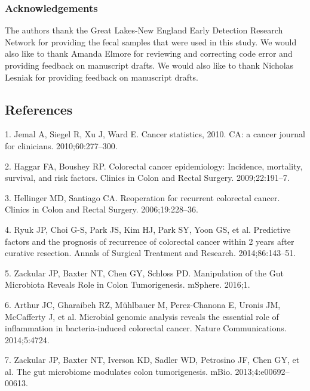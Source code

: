 \documentclass[12pt,]{article}
\begin{document}
\subsubsection{Acknowledgements}\label{acknowledgements}

The authors thank the Great Lakes-New England Early Detection Research
Network for providing the fecal samples that were used in this study. We
would also like to thank Amanda Elmore for reviewing and correcting code
error and providing feedback on manuscript drafts. We would also like to
thank Nicholas Lesniak for providing feedback on manuscript drafts.

\newpage

\subsection*{References}\label{references}

\hypertarget{refs}{}
\hypertarget{ref-jemal_cancer_2010}{}
1. Jemal A, Siegel R, Xu J, Ward E. Cancer statistics, 2010. CA: a
cancer journal for clinicians. 2010;60:277--300.

\hypertarget{ref-haggar_colorectal_2009}{}
2. Haggar FA, Boushey RP. Colorectal cancer epidemiology: Incidence,
mortality, survival, and risk factors. Clinics in Colon and Rectal
Surgery. 2009;22:191--7.

\hypertarget{ref-hellinger_reoperation_2006}{}
3. Hellinger MD, Santiago CA. Reoperation for recurrent colorectal
cancer. Clinics in Colon and Rectal Surgery. 2006;19:228--36.

\hypertarget{ref-ryuk_predictive_2014}{}
4. Ryuk JP, Choi G-S, Park JS, Kim HJ, Park SY, Yoon GS, et al.
Predictive factors and the prognosis of recurrence of colorectal cancer
within 2 years after curative resection. Annals of Surgical Treatment
and Research. 2014;86:143--51.

\hypertarget{ref-zackular_manipulation_2016}{}
5. Zackular JP, Baxter NT, Chen GY, Schloss PD. Manipulation of the Gut
Microbiota Reveals Role in Colon Tumorigenesis. mSphere. 2016;1.

\hypertarget{ref-arthur_microbial_2014}{}
6. Arthur JC, Gharaibeh RZ, Mühlbauer M, Perez-Chanona E, Uronis JM,
McCafferty J, et al. Microbial genomic analysis reveals the essential
role of inflammation in bacteria-induced colorectal cancer. Nature
Communications. 2014;5:4724.

\hypertarget{ref-zackular_gut_2013}{}
7. Zackular JP, Baxter NT, Iverson KD, Sadler WD, Petrosino JF, Chen GY,
et al. The gut microbiome modulates colon tumorigenesis. mBio.
2013;4:e00692--00613.
\end{document}
